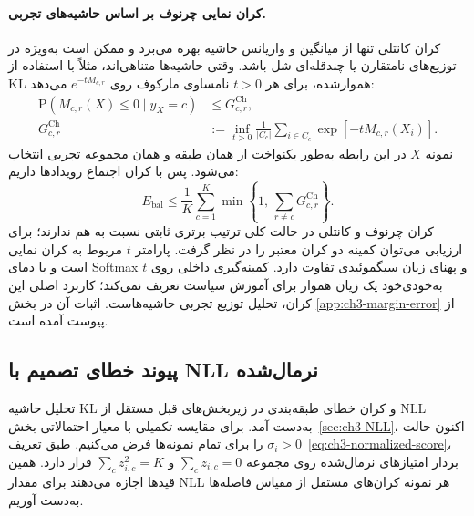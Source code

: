 \paragraph{کران نمایی چرنوف بر اساس حاشیه‌های تجربی.}
کران کانتلی تنها از میانگین و
واریانس حاشیه بهره می‌برد و ممکن
است به‌ویژه در توزیع‌های نامتقارن
یا چندقله‌ای شل باشد. وقتی
حاشیه‌ها متناهی‌اند، مثلاً با
استفاده از KL هموارشده،
برای هر $t>0$ نامساوی مارکوف
روی $e^{-tM_{c,r}}$ می‌دهد:
\begin{equation}\label{eq:ch3-margin-Chernoff}
\boxed{
\begin{aligned}
\mathrm P(M_{c,r}(X)\le0\mid y_X=c)
&\le G_{c,r}^{\mathrm{Ch}},\\
G_{c,r}^{\mathrm{Ch}}
&:=\inf_{t>0}
\frac1{|C_c|}\sum_{i\in C_c}
\exp[-t M_{c,r}(X_i)].
\end{aligned}
}
\end{equation}
نمونه $X$ در این رابطه
به‌طور یکنواخت از همان طبقه
و همان مجموعه تجربی انتخاب می‌شود.
پس با کران اجتماع رویدادها داریم:
\begin{equation}\label{eq:ch3-margin-Chernoff-balanced}
\boxed{
E_{\mathrm{bal}}\le
\frac1K\sum_{c=1}^{K}
\min\!\left\{1,\,
\sum_{r\ne c}G_{c,r}^{\mathrm{Ch}}\right\}.
}
\end{equation}
کران چرنوف و کانتلی
در حالت کلی ترتیب برتری
ثابتی نسبت به هم ندارند؛
برای ارزیابی می‌توان کمینه
دو کران معتبر را در نظر گرفت.
پارامتر $t$ مربوط به کران
نمایی است و با دمای Softmax
و پهنای زیان سیگموئیدی
تفاوت دارد. کمینه‌گیری
داخلی روی $t$ به‌خودی‌خود
یک زیان هموار برای آموزش
سیاست تعریف نمی‌کند؛
کاربرد اصلی این کران،
تحلیل توزیع تجربی حاشیه‌هاست.
اثبات آن در بخش
\ref{app:ch3-margin-error}
از پیوست آمده است.


\subsection{پیوند خطای تصمیم با NLL نرمال‌شده}
\label{subsec:ch3-margin-normalized-bound}
تحلیل حاشیه KL و کران خطای طبقه‌بندی در زیربخش‌های قبل مستقل از NLL به‌دست آمد. برای مقایسه تکمیلی با معیار احتمالاتی بخش~\ref{sec:ch3-NLL}، اکنون حالت $\sigma_i>0$ را برای تمام نمونه‌ها فرض می‌کنیم. طبق تعریف~\eqref{eq:ch3-normalized-score}، بردار امتیازهای نرمال‌شده روی مجموعه $\sum_cz_{i,c}=0$ و $\sum_cz_{i,c}^2=K$ قرار دارد. همین قیدها اجازه می‌دهند برای مقدار NLL هر نمونه کران‌های مستقل از مقیاس فاصله‌ها به‌دست آوریم.

